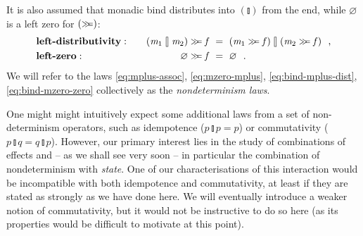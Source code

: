 \documentclass{llncs}
\newcommand{\Varid}[1]{\mathit{#1}}
\let\Varid\mathit
\begin{document}
It is also assumed that monadic bind distributes into \ensuremath{(\talloblong)} from the end,
while \ensuremath{\Varid{\varnothing}} is a left zero for \ensuremath{(\mathrel{\hstretch{0.7}{>\!\!>\!\!=}})}:
\begin{alignat}{2}
  &\mbox{\bf left-distributivity}:\quad &
  \ensuremath{(\Varid{m}_{1}\mathbin{\talloblong}\Varid{m}_{2})\mathrel{\hstretch{0.7}{>\!\!>\!\!=}}\Varid{f}} ~&=~ \ensuremath{(\Varid{m}_{1}\mathrel{\hstretch{0.7}{>\!\!>\!\!=}}\Varid{f})\mathbin{\talloblong}(\Varid{m}_{2}\mathrel{\hstretch{0.7}{>\!\!>\!\!=}}\Varid{f})} \mbox{~~,}
  \label{eq:bind-mplus-dist}\\
  &\mbox{\bf left-zero}:\quad &
  \ensuremath{\Varid{\varnothing}\mathrel{\hstretch{0.7}{>\!\!>\!\!=}}\Varid{f}} ~&=~ \ensuremath{\Varid{\varnothing}} \label{eq:bind-mzero-zero} \mbox{~~.}
\end{alignat}
We will refer to the laws \eqref{eq:mplus-assoc}, \eqref{eq:mzero-mplus},
\eqref{eq:bind-mplus-dist}, \eqref{eq:bind-mzero-zero} collectively as the
\emph{nondeterminism laws}.

One might might intuitively expect some additional laws from a set of non-determinism
operators, such as idempotence (\ensuremath{\Varid{p}\mathbin{\talloblong}\Varid{p}\mathrel{=}\Varid{p}}) or
commutativity (\ensuremath{\Varid{p}\mathbin{\talloblong}\Varid{q}\mathrel{=}\Varid{q}\mathbin{\talloblong}\Varid{p}}).
However, our primary interest lies in the study of combinations of effects and
-- as we shall see very soon -- in particular the combination of nondeterminism with
\emph{state}.
One of our characterisations of this interaction would be incompatible with both
idempotence and commutativity, at least if they are stated as strongly as we
have done here. We will eventually introduce a weaker notion of commutativity,
but it would not be instructive to do so here (as its properties would be
difficult to motivate at this point).
\end{document}
